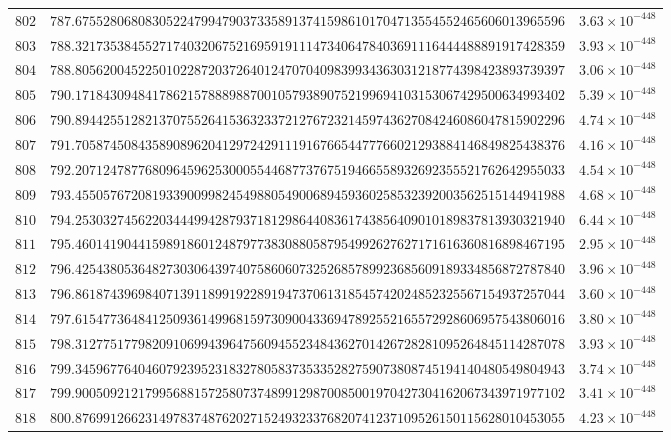 \documentclass[12pt,reqno]{amsart}
\theoremstyle{remark}
\begin{document}
\begin{longtable}{clc}
$802$ & $787.6755280680830522479947903733589137415986101704713554552465606013965596$ & $3.63\times 10^{-448}$ \\
$803$ & $788.3217353845527174032067521695919111473406478403691116444488891917428359$ & $3.93\times 10^{-448}$ \\
$804$ & $788.8056200452250102287203726401247070409839934363031218774398423893739397$ & $3.06\times 10^{-448}$ \\
$805$ & $790.1718430948417862157888988700105793890752199694103153067429500634993402$ & $5.39\times 10^{-448}$ \\
$806$ & $790.8944255128213707552641536323372127672321459743627084246086047815902296$ & $4.74\times 10^{-448}$ \\
$807$ & $791.7058745084358908962041297242911191676654477766021293884146849825438376$ & $4.16\times 10^{-448}$ \\
$808$ & $792.2071247877680964596253000554468773767519466558932692355521762642955033$ & $4.54\times 10^{-448}$ \\
$809$ & $793.4550576720819339009982454988054900689459360258532392003562515144941988$ & $4.68\times 10^{-448}$ \\
$810$ & $794.2530327456220344499428793718129864408361743856409010189837813930321940$ & $6.44\times 10^{-448}$ \\
$811$ & $795.4601419044159891860124879773830880587954992627627171616360816898467195$ & $2.95\times 10^{-448}$ \\
$812$ & $796.4254380536482730306439740758606073252685789923685609189334856872787840$ & $3.96\times 10^{-448}$ \\
$813$ & $796.8618743969840713911899192289194737061318545742024852325567154937257044$ & $3.60\times 10^{-448}$ \\
$814$ & $797.6154773648412509361499681597309004336947892552165572928606957543806016$ & $3.80\times 10^{-448}$ \\
$815$ & $798.3127751779820910699439647560945523484362701426728281095264845114287078$ & $3.93\times 10^{-448}$ \\
$816$ & $799.3459677640460792395231832780583735335282759073808745194140480549804943$ & $3.74\times 10^{-448}$ \\
$817$ & $799.9005092121799568815725807374899129870085001970427304162067343971977102$ & $3.41\times 10^{-448}$ \\
$818$ & $800.8769912662314978374876202715249323376820741237109526150115628010453055$ & $4.23\times 10^{-448}$ \\

\end{longtable}
\end{document}

